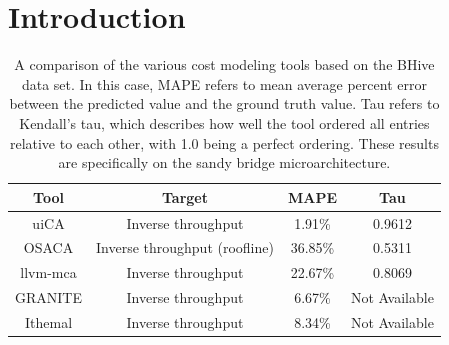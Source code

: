 \documentclass[sigconf]{acmart}
\begin{document}


\maketitle

\section{Introduction}

\begin{table}[t]
\begin{tabular}{|c|c|c|c|}
\hline
Tool & Target & MAPE & Tau \\
\hline
\hline
uiCA \cite{abel2022uica} & Inverse throughput & 1.91\% & 0.9612 \\
\hline
OSACA \cite{laukemann2018osaca} & Inverse throughput (roofline) & 36.85\% & 0.5311 \\
\hline
llvm-mca \cite{dibiagio2018mca} & Inverse throughput & 22.67\% & 0.8069 \\
\hline
GRANITE \cite{sykora2022granite} & Inverse throughput & 6.67\% & Not Available \\
\hline
Ithemal \cite{mendis2019ithemal} & Inverse throughput & 8.34\% & Not Available \\
\hline
\end{tabular}
\caption{A comparison of the various cost modeling tools based on the BHive data set. In this case, MAPE refers to mean
average percent error between the predicted value and the ground truth value. Tau refers to Kendall's tau, which describes
how well the tool ordered all entries relative to each other, with 1.0 being a perfect ordering. These results are
specifically on the sandy bridge microarchitecture.}
\end{table}
\end{document}
